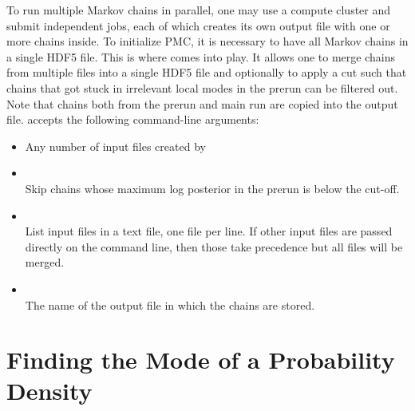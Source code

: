 To run multiple Markov chains in parallel, one may use a compute cluster and
submit independent jobs, each of which creates its own output file with one or
more chains inside. To initialize PMC, it is necessary to have all Markov chains
in a single HDF5 file. This is where  comes into play. It
allows one to merge chains from multiple files into a single HDF5 file and
optionally to apply a cut such that chains that got stuck in irrelevant local
modes in the prerun can be filtered out. Note that chains both from the prerun
and main run are copied into the output file.  accepts
the following command-line arguments:
\begin{itemize}
    \item[] Any number of input files created by \\[-3\medskipamount]
    \item[] \\[\medskipamount]
        Skip chains whose maximum log posterior in the prerun is below the cut-off.

    \item[] \\[\medskipamount]
        List input files in a text file, one file per line. If other input files are passed directly on the command line, then those take precedence but all files will be merged.

    \item[] \\[\medskipamount]
        The name of the output file in which the chains are stored.
\end{itemize}

\section{Finding the Mode of a Probability Density}
\label{sec:usage:ctg-find-mode}

